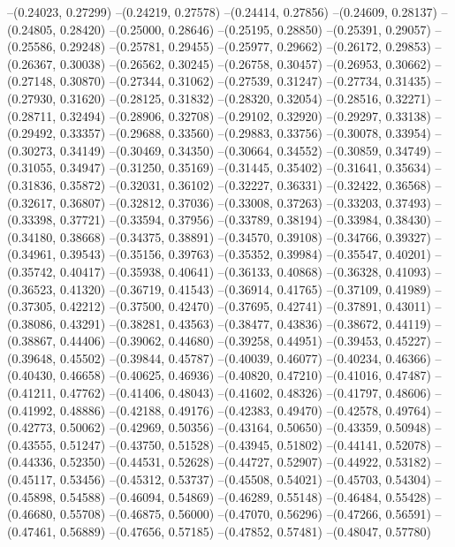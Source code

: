 --(0.24023, 0.27299)
--(0.24219, 0.27578)
--(0.24414, 0.27856)
--(0.24609, 0.28137)
--(0.24805, 0.28420)
--(0.25000, 0.28646)
--(0.25195, 0.28850)
--(0.25391, 0.29057)
--(0.25586, 0.29248)
--(0.25781, 0.29455)
--(0.25977, 0.29662)
--(0.26172, 0.29853)
--(0.26367, 0.30038)
--(0.26562, 0.30245)
--(0.26758, 0.30457)
--(0.26953, 0.30662)
--(0.27148, 0.30870)
--(0.27344, 0.31062)
--(0.27539, 0.31247)
--(0.27734, 0.31435)
--(0.27930, 0.31620)
--(0.28125, 0.31832)
--(0.28320, 0.32054)
--(0.28516, 0.32271)
--(0.28711, 0.32494)
--(0.28906, 0.32708)
--(0.29102, 0.32920)
--(0.29297, 0.33138)
--(0.29492, 0.33357)
--(0.29688, 0.33560)
--(0.29883, 0.33756)
--(0.30078, 0.33954)
--(0.30273, 0.34149)
--(0.30469, 0.34350)
--(0.30664, 0.34552)
--(0.30859, 0.34749)
--(0.31055, 0.34947)
--(0.31250, 0.35169)
--(0.31445, 0.35402)
--(0.31641, 0.35634)
--(0.31836, 0.35872)
--(0.32031, 0.36102)
--(0.32227, 0.36331)
--(0.32422, 0.36568)
--(0.32617, 0.36807)
--(0.32812, 0.37036)
--(0.33008, 0.37263)
--(0.33203, 0.37493)
--(0.33398, 0.37721)
--(0.33594, 0.37956)
--(0.33789, 0.38194)
--(0.33984, 0.38430)
--(0.34180, 0.38668)
--(0.34375, 0.38891)
--(0.34570, 0.39108)
--(0.34766, 0.39327)
--(0.34961, 0.39543)
--(0.35156, 0.39763)
--(0.35352, 0.39984)
--(0.35547, 0.40201)
--(0.35742, 0.40417)
--(0.35938, 0.40641)
--(0.36133, 0.40868)
--(0.36328, 0.41093)
--(0.36523, 0.41320)
--(0.36719, 0.41543)
--(0.36914, 0.41765)
--(0.37109, 0.41989)
--(0.37305, 0.42212)
--(0.37500, 0.42470)
--(0.37695, 0.42741)
--(0.37891, 0.43011)
--(0.38086, 0.43291)
--(0.38281, 0.43563)
--(0.38477, 0.43836)
--(0.38672, 0.44119)
--(0.38867, 0.44406)
--(0.39062, 0.44680)
--(0.39258, 0.44951)
--(0.39453, 0.45227)
--(0.39648, 0.45502)
--(0.39844, 0.45787)
--(0.40039, 0.46077)
--(0.40234, 0.46366)
--(0.40430, 0.46658)
--(0.40625, 0.46936)
--(0.40820, 0.47210)
--(0.41016, 0.47487)
--(0.41211, 0.47762)
--(0.41406, 0.48043)
--(0.41602, 0.48326)
--(0.41797, 0.48606)
--(0.41992, 0.48886)
--(0.42188, 0.49176)
--(0.42383, 0.49470)
--(0.42578, 0.49764)
--(0.42773, 0.50062)
--(0.42969, 0.50356)
--(0.43164, 0.50650)
--(0.43359, 0.50948)
--(0.43555, 0.51247)
--(0.43750, 0.51528)
--(0.43945, 0.51802)
--(0.44141, 0.52078)
--(0.44336, 0.52350)
--(0.44531, 0.52628)
--(0.44727, 0.52907)
--(0.44922, 0.53182)
--(0.45117, 0.53456)
--(0.45312, 0.53737)
--(0.45508, 0.54021)
--(0.45703, 0.54304)
--(0.45898, 0.54588)
--(0.46094, 0.54869)
--(0.46289, 0.55148)
--(0.46484, 0.55428)
--(0.46680, 0.55708)
--(0.46875, 0.56000)
--(0.47070, 0.56296)
--(0.47266, 0.56591)
--(0.47461, 0.56889)
--(0.47656, 0.57185)
--(0.47852, 0.57481)
--(0.48047, 0.57780)
